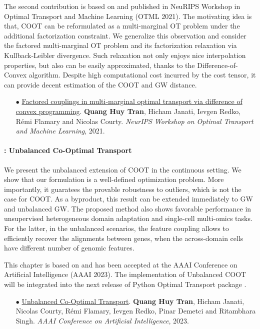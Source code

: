 The second contribution is based on \citep{Tran21} and published in NeuRIPS Workshop in Optimal
Transport and Machine Learning (OTML 2021). The motivating idea is that,
COOT can be reformulated as a multi-marginal OT problem under the additional factorization constraint.
We generalize this observation and consider the factored multi-marginal OT problem
and its factorization relaxation via Kullback-Leibler divergence.
Such relaxation not only enjoys nice interpolation properties, but also
can be easily approximated, thanks to the Difference-of-Convex algorithm.
Despite high computational cost incurred by the cost tensor,
it can provide decent estimation of the COOT and GW distance.

\begin{itemize}
    \item[$\bullet$] \ul{Factored couplings in multi-marginal optimal transport via difference of
    convex programming}. \textbf{Quang Huy Tran}, Hicham Janati, Ievgen Redko,
    Rémi Flamary and Nicolas Courty.
    \textit{NeurIPS Workshop on Optimal Transport and Machine Learning}, 2021.
\end{itemize}

\paragraph{: Unbalanced Co-Optimal Transport}

We present the unbalanced extension of COOT in the continuous setting.
We show that our formulation is a well-defined optimization problem.
More importantly, it guaratees the provable robustness to outliers, which is not the case for COOT.
As a byproduct, this result can be extended immediately to GW and unbalanced GW.
The proposed method also shows favorable performance in
unsupervised heterogeneous domain adaptation and single-cell multi-omics tasks.
For the latter, in the unbalanced scenarios, the feature coupling allows to efficiently recover
the alignments between genes, when the across-domain cells have
different number of genomic features.

This chapter is based on \citep{Tran23} and has been accepted at the
AAAI Conference on Artificial Intelligence (AAAI 2023). The implementation of
Unbalanced COOT will be
integrated into the next release of Python Optimal Transport package \citep{Flamary21}.

\begin{itemize}
    \item[$\bullet$] \ul{Unbalanced Co-Optimal Transport}. \textbf{Quang Huy Tran}, Hicham Janati,
    Nicolas Courty, Rémi Flamary, Ievgen Redko, Pinar Demetci and Ritambhara Singh.
    \textit{AAAI Conference on Artificial Intelligence}, 2023.
\end{itemize}

